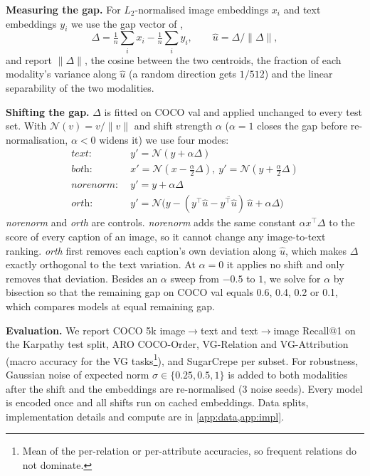 \documentclass{article}
\newcommand{\uhat}{\hat{u}}
\newcommand{\gapnorm}{\lVert\Delta\rVert}
\begin{document}
\textbf{Measuring the gap.}
For $L_2$-normalised image embeddings $x_i$ and text embeddings $y_i$ we use the gap vector of \citet{liang2022gap},
\begin{equation}
\Delta = \tfrac{1}{n}\textstyle\sum_i x_i - \tfrac{1}{n}\sum_i y_i, \qquad \uhat = \Delta/\gapnorm ,
\end{equation}
and report $\gapnorm$, the cosine between the two centroids, the fraction of each modality's variance along $\uhat$ (a random direction gets $1/512$) and the linear separability of the two modalities.

\textbf{Shifting the gap.}
$\Delta$ is fitted on COCO val and applied unchanged to every test set. With $\mathcal{N}(v)=v/\lVert v\rVert$ and shift strength $\alpha$ ($\alpha{=}1$ closes the gap before re-normalisation, $\alpha{<}0$ widens it) we use four modes:
\begin{align}
\textit{text:}\ \ & y' = \mathcal{N}(y+\alpha\Delta) \\
\textit{both:}\ \ & x' = \mathcal{N}(x-\tfrac{\alpha}{2}\Delta),\ y' = \mathcal{N}(y+\tfrac{\alpha}{2}\Delta) \\
\textit{norenorm:}\ \ & y' = y+\alpha\Delta \label{eq:norenorm}\\
\textit{orth:}\ \ & y' = \mathcal{N}\big(y - (y^\top\uhat - \overline{y^\top\uhat})\,\uhat + \alpha\Delta\big) \label{eq:orth}
\end{align}
\emph{norenorm} and \emph{orth} are controls. \emph{norenorm} adds the same constant $\alpha x^\top\Delta$ to the score of every caption of an image, so it cannot change any image-to-text ranking. \emph{orth} first removes each caption's own deviation along $\uhat$, which makes $\Delta$ exactly orthogonal to the text variation. At $\alpha{=}0$ it applies no shift and only removes that deviation. Besides an $\alpha$ sweep from $-0.5$ to $1$, we solve for $\alpha$ by bisection so that the remaining gap on COCO val equals 0.6, 0.4, 0.2 or 0.1, which compares models at equal remaining gap.

\textbf{Evaluation.}
We report COCO 5k image$\to$text and text$\to$image Recall@1 on the Karpathy test split, ARO COCO-Order, VG-Relation and VG-Attribution \citep{yuksekgonul2023bow} (macro accuracy for the VG tasks\footnote{Mean of the per-relation or per-attribute accuracies, so frequent relations do not dominate.}), and SugarCrepe \citep{hsieh2023sugarcrepe} per subset. For robustness, Gaussian noise of expected norm $\sigma\in\{0.25, 0.5, 1\}$ is added to both modalities after the shift and the embeddings are re-normalised (3 noise seeds). Every model is encoded once and all shifts run on cached embeddings. Data splits, implementation details and compute are in \cref{app:data,app:impl}.
\end{document}

